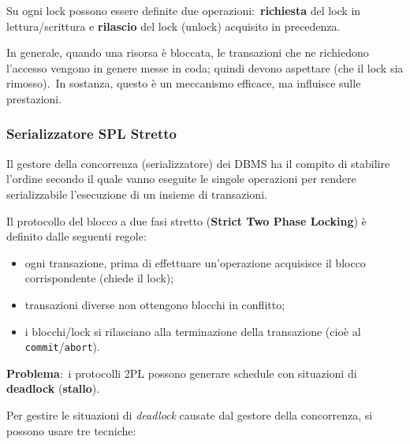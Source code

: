 \noindent Su ogni lock possono essere definite due operazioni:\ \textbf{richiesta} del lock in let\-tura{\slash}scrittura e \textbf{rilascio} del lock (unlock) acquisito in precedenza.\

In generale, quando una risorsa è bloccata, le transazioni che ne richiedono l'accesso vengono in genere messe in coda; quindi devono aspettare (che il lock sia rimosso).\
In sostanza, questo è un meccanismo efficace, ma influisce sulle prestazioni.\

\subsubsection{Serializzatore SPL Stretto}

Il gestore della concorrenza (serializzatore) dei DBMS ha il compito di stabilire l'ordine secondo il quale vanno eseguite le singole operazioni per rendere serializzabile l'esecuzione di un insieme di transazioni.

\begin{definition}
	Il protocollo del blocco a due fasi stretto (\textbf{Strict Two Phase Locking}) è definito dalle seguenti regole:
	\begin{itemize}
		\item ogni transazione, prima di effettuare un'operazione acquisisce il blocco corrispondente (chiede il lock);
		\item transazioni diverse non ottengono blocchi in conflitto;
		\item i blocchi/lock si rilasciano alla terminazione della transazione (cioè al \texttt{commit}/\texttt{abort}).
	\end{itemize}
\end{definition}

\noindent\textbf{Problema}:\ i protocolli 2PL possono generare schedule con situazioni di \textbf{deadlock} (\textbf{stallo}).

\vspace{12pt}

\noindent Per gestire le situazioni di \textit{deadlock} causate dal gestore della concorrenza, si possono usare tre tecniche:

